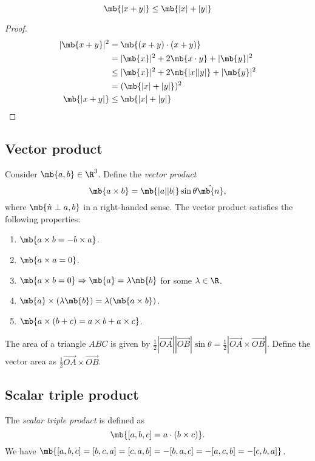 \documentclass[a4paper]{article}
\begin{document}
\begin{cor}
  \[
  \mb{|x + y|} \leq \mb{|x| + |y|}
  \]
\end{cor}
\begin{proof}
  \begin{align*}
    |\mb{x + y}|^2 &= \mb{(x + y)\cdot (x + y)}\\
    &= |\mb{x}|^2 + 2\mb{x\cdot y} + |\mb{y}|^2\\
    &\leq |\mb{x}|^2 + 2\mb{|x||y|} + |\mb{y}|^2\\
    &= (\mb{|x| + |y|})^2\\
    \mb{|x + y|} &\leq \mb{|x| + |y|}
  \end{align*}
\end{proof}

\subsection{Vector product}
\begin{defi}
  Consider $\mb{a, b}\in \R^3$. Define the \emph{vector product}
  \[
  \mb{a\times b} = \mb{|a||b|}\sin\theta \hat{\mb{n}},
  \]
  where $\mb{\hat{n}\perp a, b}$ in a right-handed sense. The vector product satisfies the following properties:
  \begin{enumerate}
  \item $\mb{a\times b = -b\times a}$.
  \item $\mb{a\times a = 0}$.
  \item $\mb{a\times b = 0}\Rightarrow \mb{a} = \lambda\mb{b}$ for some $\lambda\in \R$.
  \item $\mb{a}\times (\lambda \mb{b}) = \lambda(\mb{a\times b})$.
  \item $\mb{a\times (b + c) = a\times b + a\times c}$.
  \end{enumerate}
\end{defi}

The area of a triangle $ABC$ is given by $\frac{1}{2}|\overrightarrow{OA}||\overrightarrow{OB}|\sin\theta = \frac{1}{2}|\overrightarrow{OA}\times\overrightarrow{OB}|$. Define the vector area as $\frac{1}{2}\overrightarrow{OA}\times\overrightarrow{OB}$.

\subsection{Scalar triple product}
\begin{defi}
  The \emph{scalar triple product} is defined as
  \[
  \mb{[a, b, c] = a\cdot (b\times c)}.
  \]
We have $\mb{[a, b, c] = [b, c, a] = [c, a, b] = -[b, a, c] = -[a, c, b] = -[c, b, a]}$.
\end{defi}
\end{document}
